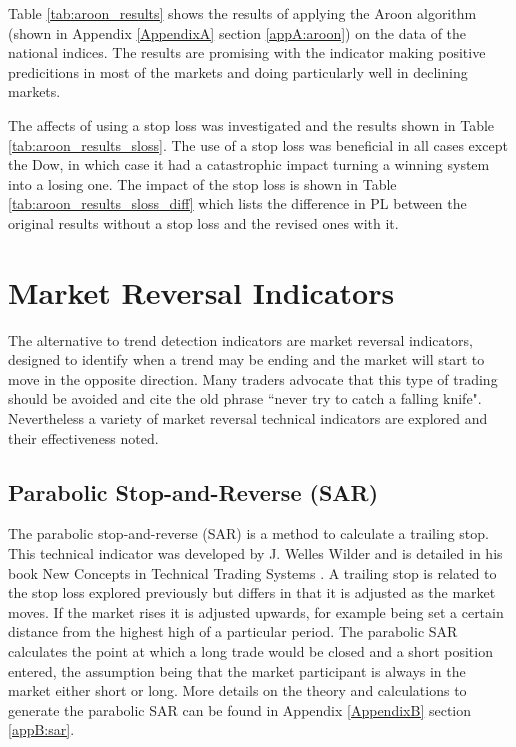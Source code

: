 

Table \ref{tab:aroon_results} shows the results of applying the Aroon algorithm (shown in Appendix \ref{AppendixA} section \ref{appA:aroon}) on the data of the national indices. The results are promising with the indicator making positive predicitions in most of the markets and doing particularly well in declining markets. 




The affects of using a stop loss was investigated and the results shown in Table \ref{tab:aroon_results_sloss}. The use of a stop loss was beneficial in all cases except the Dow, in which case it had a catastrophic impact turning a winning system into a losing one.  The impact of the stop loss is shown in Table \ref{tab:aroon_results_sloss_diff} which lists the difference in PL between the original results without a stop loss and the revised ones with it.



\section{Market Reversal Indicators}
The alternative to trend detection indicators are market reversal indicators, designed to identify when a trend may be ending and the market will start to move in the opposite direction. Many traders advocate that this type of trading should be avoided and cite the old phrase \textquotedblleft never try to catch a falling knife". Nevertheless a variety of market reversal technical indicators are explored and their effectiveness noted.

\subsection{Parabolic Stop-and-Reverse  (SAR)}
The parabolic stop-and-reverse (SAR) is a method to calculate a trailing stop. This technical indicator was developed by J. Welles Wilder and is detailed in his book New Concepts in Technical Trading Systems \citep{wilder1978new}. A trailing stop is related to the stop loss explored previously but differs in that it is adjusted as the market moves. If the market rises it is adjusted upwards, for example being set a certain distance from the highest high of a particular period. The parabolic SAR calculates the point at which a long trade would be closed and a short position entered, the assumption being that the market participant is always in the market either short or long. More details on the theory and calculations to generate the parabolic SAR can be found in Appendix \ref{AppendixB} section \ref{appB:sar}.  

